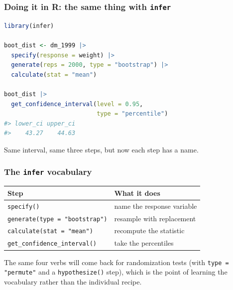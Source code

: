 \documentclass[slidestop,compress,mathserif]{beamer}
\begin{document}
\begin{frame}[fragile]
\frametitle{Doing it in R: the same thing with \texttt{infer}}

\begin{lstlisting}[language=R, basicstyle=\ttfamily\small]
library(infer)

boot_dist <- dm_1999 |>
  specify(response = weight) |>
  generate(reps = 2000, type = "bootstrap") |>
  calculate(stat = "mean")

boot_dist |>
  get_confidence_interval(level = 0.95,
                          type = "percentile")
#> lower_ci upper_ci
#>    43.27    44.63
\end{lstlisting}

\vspace{-0.4em}
Same interval, same three steps, but now each step has a name.

\end{frame}

\begin{frame}
\frametitle{The \texttt{infer} vocabulary}

\begin{center}\small
\begin{tabular}{ll}
\toprule
Step & What it does \\
\midrule
\texttt{specify()} & name the response variable \\
\texttt{generate(type = "bootstrap")} & resample with replacement \\
\texttt{calculate(stat = "mean")} & recompute the statistic \\
\texttt{get\_confidence\_interval()} & take the percentiles \\
\bottomrule
\end{tabular}
\end{center}

\vspace{0.5em}
The same four verbs will come back for randomization tests (with \texttt{type = "permute"} and a \texttt{hypothesize()} step), which is the point of learning the vocabulary rather than the individual recipe.

\end{frame}
\end{document}
